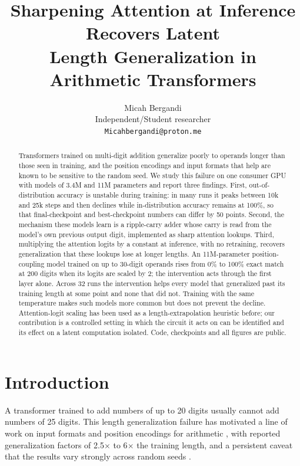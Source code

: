 \documentclass{article}
\title{Sharpening Attention at Inference Recovers Latent\\Length Generalization in Arithmetic Transformers}
\author{
  Micah Bergandi\\
  Independent/Student researcher\\
  \texttt{Micahbergandi@proton.me}
}
\date{}
\begin{document}
\maketitle

\begin{abstract}
Transformers trained on multi-digit addition generalize poorly to operands longer than those seen in training, and the position encodings and input formats that help are known to be sensitive to the random seed. We study this failure on one consumer GPU with models of 3.4M and 11M parameters and report three findings. First, out-of-distribution accuracy is unstable during training: in many runs it peaks between 10k and 25k steps and then declines while in-distribution accuracy remains at 100\%, so that final-checkpoint and best-checkpoint numbers can differ by 50 points. Second, the mechanism these models learn is a ripple-carry adder whose carry is read from the model's own previous output digit, implemented as sharp attention lookups. Third, multiplying the attention logits by a constant at inference, with no retraining, recovers generalization that these lookups lose at longer lengths. An 11M-parameter position-coupling model trained on up to 30-digit operands rises from 0\% to 100\% exact match at 200 digits when its logits are scaled by 2; the intervention acts through the first layer alone. Across 32 runs the intervention helps every model that generalized past its training length at some point and none that did not. Training with the same temperature makes such models more common but does not prevent the decline. Attention-logit scaling has been used as a length-extrapolation heuristic before; our contribution is a controlled setting in which the circuit it acts on can be identified and its effect on a latent computation isolated. Code, checkpoints and all figures are public.
\end{abstract}

\section{Introduction}

A transformer trained to add numbers of up to 20 digits usually cannot add numbers of 25 digits. This length generalization failure has motivated a line of work on input formats and position encodings for arithmetic \citep{lee2023teaching,zhou2024transformers,mcleish2024transformers,cho2024position,aba2025}, with reported generalization factors of 2.5$\times$ to 6$\times$ the training length, and a persistent caveat that the results vary strongly across random seeds \citep{zhou2024transformers}.
\end{document}
